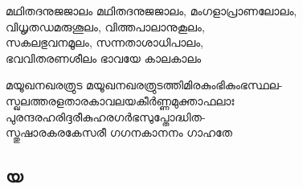 \begin{enumerate}

\begin{slokam}{\VMl}{\RV}{മഥിതദനുജജാലം}
മഥിതദനുജജാലം, മംഗളാപ്രാണലോലം,\\
വിധൃതഡമരുശൂലം, വിത്തപാലാനുകൂലം,\\
സകലഭുവനമൂലം, സന്നതാശാധിപാലം,\\
ഭവവിതരണശീലം ഭാവയേ കാലകാലം
\end{slokam}


\begin{slokam}{\VPv}{\KDBB}{മയൂഖനഖരത്രുട}
മയൂഖനഖരത്രുടത്തിമിരകുംഭികുംഭസ്ഥല-\\
സ്ഖലത്തരളതാരകാവലയകീർണ്ണമുക്താഫലാഃ\\
പുരന്ദരഹരിദ്ദരീകുഹരഗർഭസുപ്തോദ്ധിത-\\
സ്തുഷാരകരകേസരീ ഗഗനകാനനം ഗാഹതേ
\end{slokam}




\end{enumerate}

\subsection{യ}

